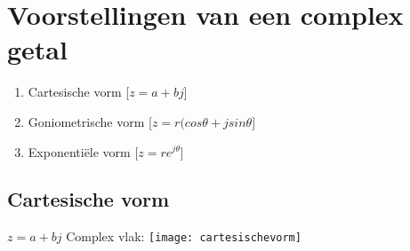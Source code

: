 \documentclass[12pt]{report}
\begin{document}
\section{Voorstellingen van een complex getal}
\begin{enumerate}
 \item {Cartesische vorm [$z = a + bj$]}
 \item {Goniometrische vorm [$z = r(cos\theta + jsin\theta$]}
 \item {Exponentiële vorm [$z = re^{j\theta}$]}
\end{enumerate}
\subsection{Cartesische vorm}
$z = a + bj$ 
\newline
Complex vlak: \texttt{[image: cartesischevorm]}
\end{document}
